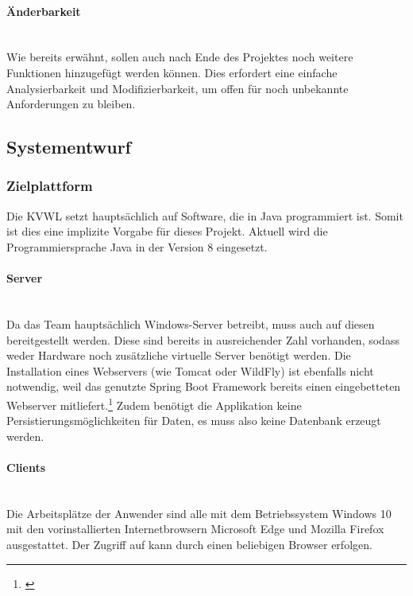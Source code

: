 \paragraph{Änderbarkeit} ~\\
\label{p:Aenderbarkeit}
Wie bereits erwähnt, sollen auch nach Ende des Projektes noch weitere Funktionen hinzugefügt werden können. Dies erfordert eine einfache Analysierbarkeit und Modifizierbarkeit, um offen für noch unbekannte Anforderungen zu bleiben.

\subsection{Systementwurf}
\label{sec:Systementwurf}

\subsubsection{Zielplattform}
\label{sec:Systementwurf}
Die \ac{KVWL} setzt hauptsächlich auf Software, die in Java programmiert ist. Somit ist dies eine implizite Vorgabe für dieses Projekt. Aktuell wird die Programmiersprache Java in der Version 8 eingesetzt.

\paragraph{Server} ~\\
\label{p:Server}
 Da das Team \teamName hauptsächlich Windows-Server betreibt, muss auch \projektName auf diesen bereitgestellt werden. Diese sind bereits in ausreichender Zahl vorhanden, sodass weder Hardware noch zusätzliche virtuelle Server benötigt werden. Die Installation eines Webservers (wie Tomcat oder WildFly) ist ebenfalls nicht notwendig, weil das genutzte Spring Boot Framework bereits einen eingebetteten Webserver mitliefert.\footnote{\Vgl \cite{spring:web}} Zudem benötigt die Applikation keine Persistierungsmöglichkeiten für Daten, es muss also keine Datenbank erzeugt werden.
 
\paragraph{Clients} ~\\
\label{p:Clients}
 Die Arbeitsplätze der Anwender sind alle mit dem Betriebssystem Windows 10 mit den vorinstallierten Internetbrowsern Microsoft Edge und Mozilla Firefox ausgestattet. Der Zugriff auf \projektName kann durch einen beliebigen Browser erfolgen.


